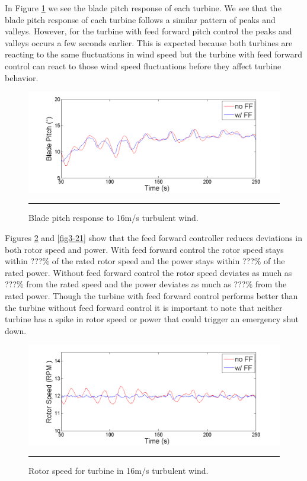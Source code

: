 In Figure \ref{fig3-19} we see the blade pitch response of each turbine. We see that the blade pitch response of each turbine follows a similar pattern of peaks and valleys. However, for the turbine with feed forward pitch control the peaks and valleys occurs a few seconds earlier. This is expected because both turbines are reacting to the same fluctuations in wind speed but the turbine with feed forward control can react to those wind speed fluctuations before they affect turbine behavior. 

\begin{figure}[htbp]
	\centering
		\includegraphics[trim = {1cm 0 2cm 0}, clip, width = \linewidth]{Figures/ch3Figures/fig3-19.png}
		\rule{35em}{0.5pt}
	\caption{Blade pitch response to 16m/s turbulent wind.}
	\label{fig3-19}
\end{figure}

Figures \ref{fig3-20} and \ref{fig3-21} show that the feed forward controller  reduces deviations in both rotor speed and power. With feed forward control the rotor speed stays within ???$\%$ of the rated rotor speed and the power stays within ???$\%$ of the rated power. Without feed forward control the rotor speed deviates as much as ???$\%$ from the rated speed and the power deviates as much as ???$\%$ from the rated power. Though the turbine with feed forward control performs better than the turbine without feed forward control it is important to note that neither turbine has a spike in rotor speed or power that could trigger an emergency shut down.

\begin{figure}[htbp]
	\centering
		\includegraphics[trim = {1cm 0 2cm 0}, clip, width = \linewidth]{Figures/ch3Figures/fig3-20.png}
		\rule{35em}{0.5pt}
	\caption{Rotor speed for turbine in 16m/s turbulent wind.}
	\label{fig3-20}
\end{figure}

